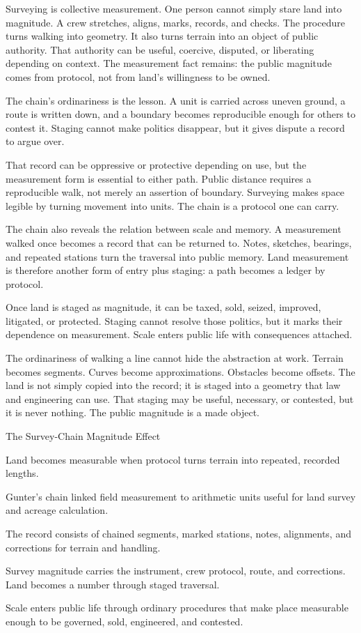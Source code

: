 Surveying is collective measurement. One person cannot simply stare land
into magnitude. A crew stretches, aligns, marks, records, and checks. The
procedure turns walking into geometry. It also turns terrain into an
object of public authority. That authority can be useful, coercive,
disputed, or liberating depending on context. The measurement fact
remains: the public magnitude comes from protocol, not from land's
willingness to be owned.

The chain's ordinariness is the lesson. A unit is carried across uneven
ground, a route is written down, and a boundary becomes reproducible enough
for others to contest it. Staging cannot make politics disappear, but it
gives dispute a record to argue over.

That record can be oppressive or protective depending on use, but the
measurement form is essential to either path. Public distance requires a
reproducible walk, not merely an assertion of boundary. Surveying makes
space legible by turning movement into units. The chain is a protocol
one can carry.

The chain also reveals the relation between scale and memory. A
measurement walked once becomes a record that can be returned to. Notes,
sketches, bearings, and repeated stations turn the traversal into public
memory. Land measurement is therefore another form of entry plus
staging: a path becomes a ledger by protocol.

Once land is staged as magnitude, it can be taxed, sold, seized,
improved, litigated, or protected. Staging cannot resolve those politics,
but it marks their dependence on measurement. Scale enters public life
with consequences attached.

The ordinariness of walking a line cannot hide the abstraction at work.
Terrain becomes segments. Curves become approximations. Obstacles become
offsets. The land is not simply copied into the record; it is staged
into a geometry that law and engineering can use. That staging may be
useful, necessary, or contested, but it is never nothing. The public
magnitude is a made object.

\begin{phenom}{The Survey-Chain Magnitude Effect~\cite{gunter1624}}
\label{ph:survey-chain-magnitude}

\PhStatement
Land becomes measurable when protocol turns terrain into repeated, recorded
lengths.

\PhOrigin
Gunter's chain linked field measurement to arithmetic units useful for land
survey and acreage calculation.

\PhObservation
The record consists of chained segments, marked stations, notes, alignments,
and corrections for terrain and handling.

\PhConstraint
Survey magnitude carries the instrument, crew protocol, route, and
corrections. Land becomes a number through staged traversal.

\PhConsequence
Scale enters public life through ordinary procedures that make place
measurable enough to be governed, sold, engineered, and contested.
\end{phenom}

